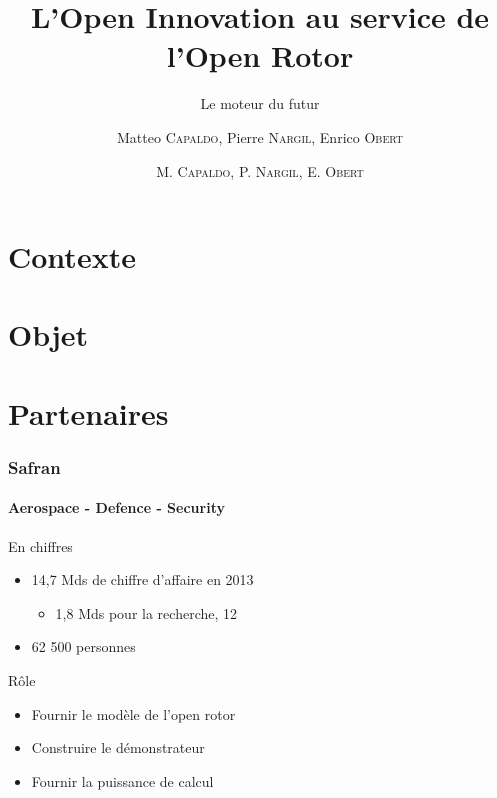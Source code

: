 \documentclass[12pt]{beamer}
\title{L'Open Innovation au service de l'Open Rotor}
\subtitle{Le moteur du futur}
\author{Matteo \textsc{Capaldo}, Pierre \textsc{Nargil}, Enrico \textsc{Obert}}
\begin{document}
\frame{\titlepage}
\author{M. \textsc{Capaldo}, P. \textsc{Nargil}, E. \textsc{Obert}}

\frame{\tableofcontents}
\section{Contexte}
\section{Objet}
\section{Partenaires}
\begin{frame}
\addtocounter{framenumber}{5}

\frametitle{Safran}
\framesubtitle{Aerospace - Defence - Security}

\begin{block}{En chiffres}
\begin{itemize}
  \item 14,7 Mds de chiffre d'affaire en 2013
  \begin{itemize}
     \item 1,8 Mds pour la recherche, 12%
  \end{itemize}
  \item 62 500 personnes
\end{itemize}
\end{block}
\begin{block}{Rôle}
\begin{itemize}
  \item Fournir le modèle de l'open rotor
  \item Construire le démonstrateur
  \item Fournir la puissance de calcul
\end{itemize}
\end{block}

\end{frame}
\end{document}
